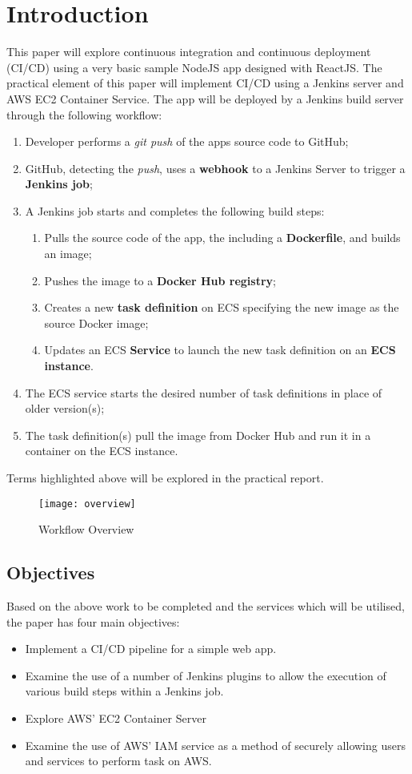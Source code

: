 \section{Introduction}
	This paper will explore continuous integration and continuous deployment (CI/CD) using a very basic sample NodeJS app designed with ReactJS. The practical element of this paper will implement CI/CD using a Jenkins server and AWS EC2 Container Service. The app will be deployed by a Jenkins build server  through the following workflow:
	
	\begin{enumerate}
		\item Developer performs a \textit{git push} of the apps source code to GitHub;
		\item GitHub, detecting the \textit{push}, uses a \textbf{webhook} to a Jenkins Server to trigger a \textbf{Jenkins job};
		\item A Jenkins job starts and completes the following build steps:
		\begin{enumerate}
			\item Pulls the source code of the app, the including a \textbf{Dockerfile}, and builds an image;
			\item Pushes the image to a \textbf{Docker Hub registry};
			\item Creates a new \textbf{task definition} on ECS specifying the new image as the source Docker image;
			\item Updates an ECS \textbf{Service} to launch the new task definition on an \textbf{ECS instance}.
		\end{enumerate}
		\item The ECS service starts the desired number of task definitions in place of older version(s);
		\item The task definition(s) pull the image from Docker Hub and run it in a container on the ECS instance.
	\end{enumerate}
	Terms highlighted above will be explored in the practical report.
	
	\begin{figure}[H]
		\caption{Workflow Overview}
		\centering
		\texttt{[image: overview]}
		\label{fig:overview}
	\end{figure}

	\subsection{Objectives}
	Based on the above work to be completed and the services which will be utilised, the paper has four main objectives:
	\begin{itemize}
		\item Implement a CI/CD pipeline for a simple web app.
		\item Examine the use of a number of Jenkins plugins to allow the execution of various build steps within a Jenkins job.
		\item Explore AWS'  EC2 Container Server
		\item Examine the use of AWS' IAM service as a method of securely allowing users and services to perform task on AWS.
	\end{itemize}
	
